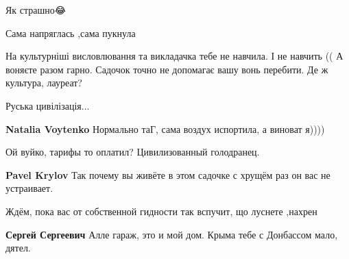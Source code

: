 \begin{itemize}
\begin{itemize}
Як страшно😂

 
Сама напряглась ,сама пукнула🤣

 

На культурніші висловлювання та викладачка тебе не навчила. І не навчить (( А
воняєте разом гарно. Садочок точно не допомагає вашу вонь перебити. Де ж
культура, лауреат?

 
Руська цивілізація...

 
\textbf{Natalia Voytenko} Нормально таГ, сама воздух испортила, а виноват я))))

 
Ой вуйко, тарифы то оплатил? Цивилизованный голодранец.

 
\textbf{Pavel Krylov} Так почему вы живёте в этом садочке с хрущём раз он вас не устраивает.

 
Ждём, пока вас от собственной гидности так вспучит, що луснете ,нахрен

 
\textbf{Сергей Сергеевич} Алле гараж, это и мой дом. Крыма тебе с Донбассом мало, дятел.


\end{itemize}
\end{itemize}
